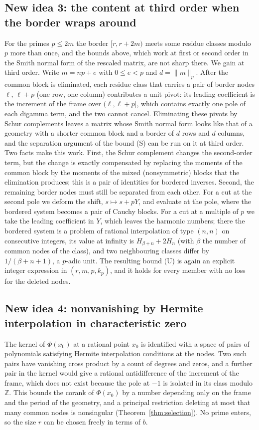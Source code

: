 \documentclass[11pt]{amsart}
\theoremstyle{definition}
\theoremstyle{remark}
\numberwithin{equation}{section}
\newcommand{\Z}{\mathbb Z}
\begin{document}
\subsection{New idea 3: the content at third order when the border wraps around}
For the primes $p\le2m$ the border $[r,r+2m)$ meets some residue classes modulo $p$ more than once, and the bounds above,
which work at first or second order in the Smith normal form of the rescaled matrix, are not sharp there. We gain at
third order. Write $m=np+e$ with $0\le e<p$ and $d=\|m\|_p$. After the common
block is eliminated, each residue class that carries a pair of border nodes $\ell$, $\ell+p$ (one row, one column)
contributes a unit pivot: its leading coefficient is the increment of the frame over $(\ell,\ell+p]$, which contains exactly
one pole of each digamma term, and the two cannot cancel. Eliminating these pivots by Schur complements leaves a matrix
whose Smith normal form looks like that of a geometry with a shorter common block and a border of $d$ rows and $d$ columns,
and the separation argument of the bound (S) can be run on it at third order. Two facts make this work. First, the Schur
complement changes the second-order term, but the change is exactly compensated by replacing the moments of the common block
by the moments of the mixed (nonsymmetric) blocks that the elimination produces; this is a pair of identities for bordered
inverses. Second, the remaining border nodes must still be separated from each other. For a cut at the second pole we
deform the shift, $s\mapsto s+pY$, and evaluate at the pole, where the bordered system becomes a pair of Cauchy blocks. For
a cut at a multiple of $p$ we take the leading coefficient in $Y$, which leaves the harmonic numbers; there the bordered
system is a problem of rational interpolation of type $(n,n)$ on consecutive integers, its value at infinity is
$H_{\beta+n}+2H_n$ (with $\beta$ the number of common nodes of the class), and two neighbouring classes differ by
$1/(\beta+n+1)$, a $p$-adic unit. The resulting bound (U) is again an explicit integer expression in $(r,m,p,k_p)$, and it
holds for every member with no loss for the deleted nodes.

\subsection{New idea 4: nonvanishing by Hermite interpolation in characteristic zero}
The kernel of $\Phi(x_0)$ at a rational point $x_0$ is identified with a space of pairs of polynomials satisfying
Hermite interpolation conditions at the nodes. Two such pairs have vanishing cross product by a count of degrees and
zeros, and a further pair in the kernel would give a rational antidifference of the increment of the frame, which
does not exist because the pole at $-1$ is isolated in its class modulo $\Z$. This bounds the corank of $\Phi(x_0)$ by a
number depending only on the frame and the period of the geometry, and a principal restriction deleting at most that
many common nodes is nonsingular (Theorem~\ref{thm:selection}). No prime enters, so the size $r$ can be chosen freely
in terms of $b$.
\end{document}
